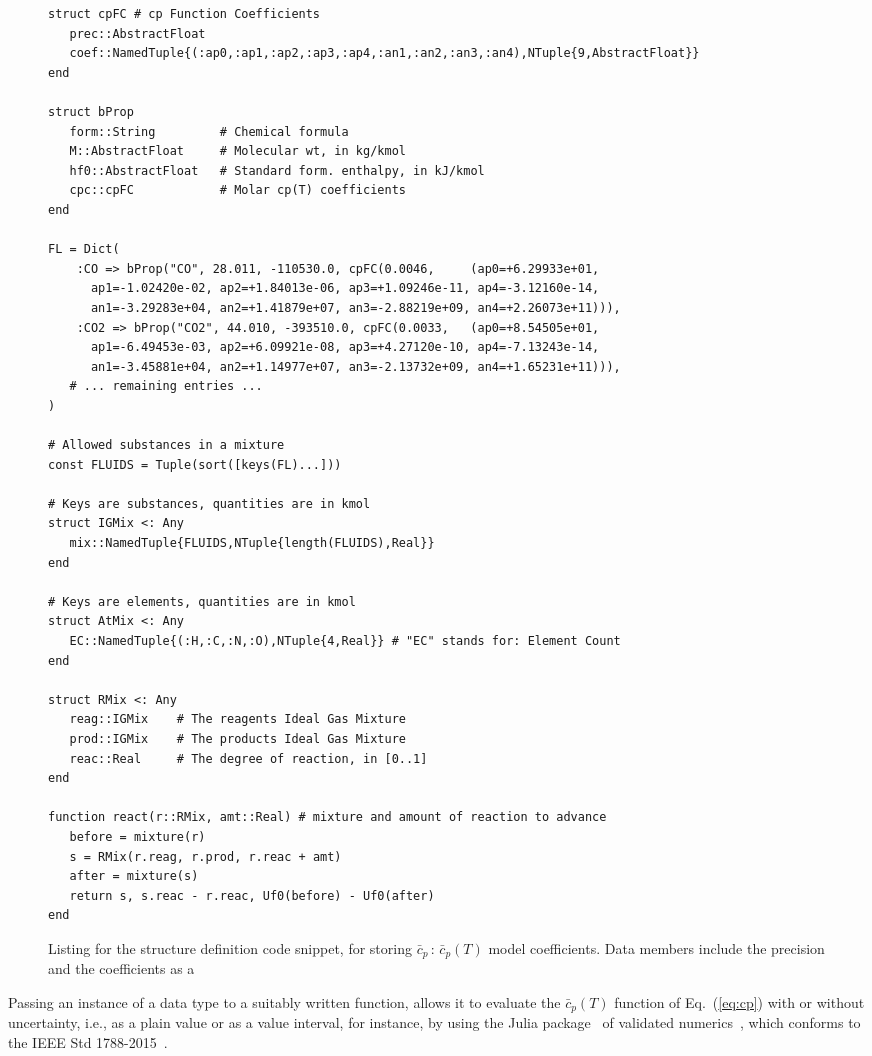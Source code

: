     \begin{figure*}[ht]
        \centering
        \begin{lstlisting}
struct cpFC # cp Function Coefficients
   prec::AbstractFloat
   coef::NamedTuple{(:ap0,:ap1,:ap2,:ap3,:ap4,:an1,:an2,:an3,:an4),NTuple{9,AbstractFloat}}
end

struct bProp
   form::String         # Chemical formula
   M::AbstractFloat     # Molecular wt, in kg/kmol
   hf0::AbstractFloat   # Standard form. enthalpy, in kJ/kmol
   cpc::cpFC            # Molar cp(T) coefficients
end

FL = Dict(
    :CO => bProp("CO", 28.011, -110530.0, cpFC(0.0046,     (ap0=+6.29933e+01,
      ap1=-1.02420e-02, ap2=+1.84013e-06, ap3=+1.09246e-11, ap4=-3.12160e-14,
      an1=-3.29283e+04, an2=+1.41879e+07, an3=-2.88219e+09, an4=+2.26073e+11))),
    :CO2 => bProp("CO2", 44.010, -393510.0, cpFC(0.0033,   (ap0=+8.54505e+01,
      ap1=-6.49453e-03, ap2=+6.09921e-08, ap3=+4.27120e-10, ap4=-7.13243e-14,
      an1=-3.45881e+04, an2=+1.14977e+07, an3=-2.13732e+09, an4=+1.65231e+11))),
   # ... remaining entries ...
)

# Allowed substances in a mixture
const FLUIDS = Tuple(sort([keys(FL)...]))

# Keys are substances, quantities are in kmol
struct IGMix <: Any
   mix::NamedTuple{FLUIDS,NTuple{length(FLUIDS),Real}}
end

# Keys are elements, quantities are in kmol
struct AtMix <: Any
   EC::NamedTuple{(:H,:C,:N,:O),NTuple{4,Real}} # "EC" stands for: Element Count
end

struct RMix <: Any
   reag::IGMix    # The reagents Ideal Gas Mixture
   prod::IGMix    # The products Ideal Gas Mixture
   reac::Real     # The degree of reaction, in [0..1]
end

function react(r::RMix, amt::Real) # mixture and amount of reaction to advance
   before = mixture(r)
   s = RMix(r.reag, r.prod, r.reac + amt)
   after = mixture(s)
   return s, s.reac - r.reac, Uf0(before) - Uf0(after)
end
        \end{lstlisting}
        \caption{Listing for the  structure definition code snippet, for storing $\bar{c}_p\,:\,\bar{c}_p(T)$ model coefficients. Data members include the precision   and
            the  coefficients as a }
        \label{fig:code.gasLib}
    \end{figure*}

    Passing an instance of a  data type to a suitably written function, allows it to evaluate the $\bar{c}_p(T)$ function of Eq.~(\ref{eq:cp}) with or without uncertainty, i.e.,  as
    a plain value or as a value interval, for instance, by  using  the    Julia  package~\cite{2020-BenetL+SandersDP-IntervalArithmetic.jl}  of  validated
    numerics~\cite{2011-TuckerW-Princeton-Validated, 2009-MooreR-SIAM-Introduction}, which conforms to the IEEE Std 1788-2015~\cite{2015-RevolN+ThompsonT-IEEE-IA}.

